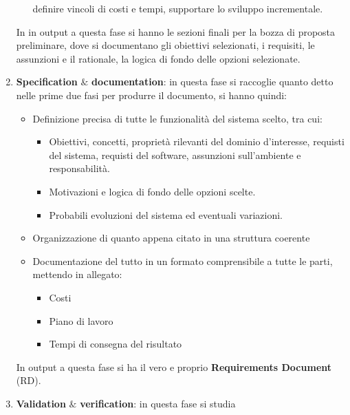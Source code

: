 \begin{enumerate}
\begin{itemize}
                        definire vincoli di costi e tempi, supportare lo sviluppo incrementale.
            \end{itemize}
            In in output a questa fase si hanno le sezioni finali per la bozza di proposta
            preliminare, dove si documentano gli obiettivi selezionati, i requisiti, le
            assunzioni e il rationale, la logica di fondo delle opzioni selezionate.
      \item \textbf{Specification} $\&$ \textbf{documentation}: in questa fase si
            raccoglie quanto detto nelle prime due fasi per produrre il documento, si hanno quindi:
            \begin{itemize}
                  \item Definizione precisa di tutte le funzionalità del sistema scelto,
                        tra cui:
                        \begin{itemize}
                              \item Obiettivi, concetti, proprietà rilevanti del dominio d'interesse,
                                    requisti del sistema, requisti del software, assunzioni sull'ambiente
                                    e responsabilità.
                              \item Motivazioni e logica di fondo delle opzioni scelte.
                              \item Probabili evoluzioni del sistema ed eventuali variazioni.
                        \end{itemize}
                  \item Organizzazione di quanto appena citato in una struttura coerente
                  \item Documentazione del tutto in un formato comprensibile a tutte le parti,
                        mettendo in allegato:
                        \begin{itemize}
                              \item Costi
                              \item Piano di lavoro
                              \item Tempi di consegna del risultato
                        \end{itemize}
            \end{itemize}
            In output a questa fase si ha il vero e proprio \textbf{Requirements Document}
            (RD).
      \item \textbf{Validation} $\&$ \textbf{verification}: in questa fase si studia

\end{enumerate}

